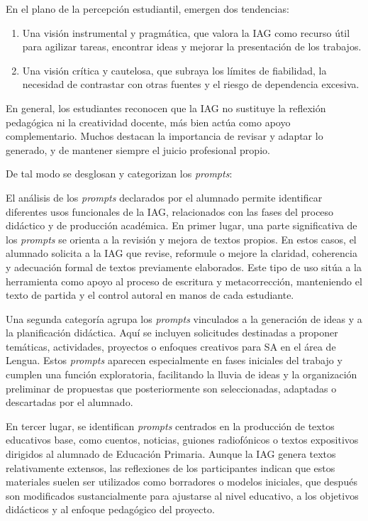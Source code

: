 \documentclass[spanish]{textolivre}
\begin{document}
En el plano de la percepción estudiantil, emergen dos tendencias:

\begin{enumerate}
    \item Una visión instrumental y pragmática, que valora la IAG como recurso útil para agilizar tareas, encontrar ideas y mejorar la presentación de los trabajos.
    \item Una visión crítica y cautelosa, que subraya los límites de fiabilidad, la necesidad de contrastar con otras fuentes y el riesgo de dependencia excesiva.
\end{enumerate}

En general, los estudiantes reconocen que la IAG no sustituye la reflexión pedagógica ni la creatividad docente, más bien actúa como apoyo complementario. Muchos destacan la importancia de revisar y adaptar lo generado, y de mantener siempre el juicio profesional propio.

De tal modo se desglosan y categorizan los \textit{prompts}:

El análisis de los \textit{prompts} declarados por el alumnado permite identificar diferentes usos funcionales de la IAG, relacionados con las fases del proceso didáctico y de producción académica. En primer lugar, una parte significativa de los \textit{prompts} se orienta a la revisión y mejora de textos propios. En estos casos, el alumnado solicita a la IAG que revise, reformule o mejore la claridad, coherencia y adecuación formal de textos previamente elaborados. Este tipo de uso sitúa a la herramienta como apoyo al proceso de escritura y metacorrección, manteniendo el texto de partida y el control autoral en manos de cada estudiante.

Una segunda categoría agrupa los \textit{prompts} vinculados a la generación de ideas y a la planificación didáctica. Aquí se incluyen solicitudes destinadas a proponer temáticas, actividades, proyectos o enfoques creativos para SA en el área de Lengua. Estos \textit{prompts} aparecen especialmente en fases iniciales del trabajo y cumplen una función exploratoria, facilitando la lluvia de ideas y la organización preliminar de propuestas que posteriormente son seleccionadas, adaptadas o descartadas por el alumnado.

En tercer lugar, se identifican \textit{prompts} centrados en la producción de textos educativos base, como cuentos, noticias, guiones radiofónicos o textos expositivos dirigidos al alumnado de Educación Primaria. Aunque la IAG genera textos relativamente extensos, las reflexiones de los participantes indican que estos materiales suelen ser utilizados como borradores o modelos iniciales, que después son modificados sustancialmente para ajustarse al nivel educativo, a los objetivos didácticos y al enfoque pedagógico del proyecto.
\end{document}
